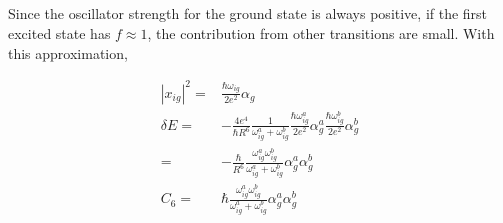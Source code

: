 \documentclass[10pt,fleqn]{article}
\newcommand{\eqar}[1]
{
  \begin{align*}
    #1
  \end{align*}
}
\newcommand{\abs}[1]{{\left|{#1}\right|}}
\begin{document}
\subsection{}
Since the oscillator strength for the ground state is always positive, if the first excited state has $f\approx1$, the contribution from other transitions are small. With this approximation,
\eqar{
  \abs{x_{ig}}^2=&\frac{\hbar\omega_{ig}}{2e^2}\alpha_g\\
  \delta E=&-\frac{4e^4}{\hbar R^6}\frac{1}{\omega^a_{ig}+\omega^b_{ig}}\frac{\hbar\omega^a_{ig}}{2e^2}\alpha^a_g\frac{\hbar\omega^b_{ig}}{2e^2}\alpha^b_g\\
  =&-\frac{\hbar}{R^6}\frac{\omega^a_{ig}\omega^b_{ig}}{\omega^a_{ig}+\omega^b_{ig}}\alpha^a_g\alpha^b_g\\
  C_6=&\hbar\frac{\omega^a_{ig}\omega^b_{ig}}{\omega^a_{ig}+\omega^b_{ig}}\alpha^a_g\alpha^b_g
}
\end{document}
